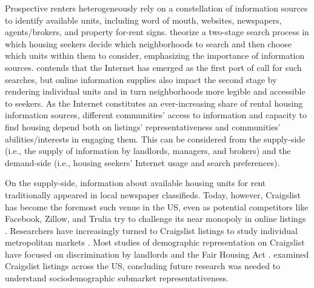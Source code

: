 \documentclass[11pt,letterpaper]{article}
\begin{document}
Prospective renters heterogeneously rely on a constellation of information sources to identify available units, including word of mouth, websites, newspapers, agents/brokers, and property for-rent signs. \citet{krysan_cycle_2017} theorize a two-stage search process in which housing seekers decide which neighborhoods to search and then choose which units within them to consider, emphasizing the importance of information sources. \citet{rae_online_2015} contends that the Internet has emerged as the first port of call for such searches, but online information supplies also impact the second stage by rendering individual units and in turn neighborhoods more legible and accessible to seekers. As the Internet constitutes an ever-increasing share of rental housing information sources, different communities' access to information and capacity to find housing depend both on listings' representativeness and communities' abilities/interests in engaging them. This can be considered from the supply-side (i.e., the supply of information by landlords, managers, and brokers) and the demand-side (i.e., housing seekers' Internet usage and search preferences).

On the supply-side, information about available housing units for rent traditionally appeared in local newspaper classifieds. Today, however, Craigslist has become the foremost such venue in the US, even as potential competitors like Facebook, Zillow, and Trulia try to challenge its near monopoly in online listings \citep{hau_newspaper_2006,brown_rental_2014,seamans_responses_2014,kroft_does_2014,yurieff_facebook_2017}. Researchers have increasingly turned to Craigslist listings to study individual metropolitan markets \citep[e.g.][]{besbris_language_2018,brown_converting_2017,im_energy_2017,halket_homeownership_2015,mallach_meeting_2010,schachter_immigration_2017,wegmann_understanding_2012}. Most studies of demographic representation on Craigslist have focused on discrimination by landlords \citep[e.g.][]{hanson_field_2014,carlsson_discrimination_2014} and the Fair Housing Act \citep[e.g.][]{larkin_criminal_2010,oliveri_discriminatory_2010}. \citet{boeing_new_2017} examined Craigslist listings across the US, concluding future research was needed to understand sociodemographic submarket representativeness.
\end{document}
